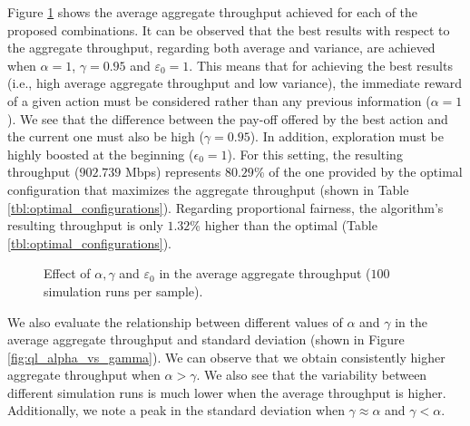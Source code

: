 \documentclass[conference]{IEEEtran}
\begin{document}
	Figure \ref{fig:ql_alpha_gamma_epsilon_evaluation} shows the average aggregate throughput achieved for each of the proposed combinations. It can be observed that the best results with respect to the aggregate throughput, regarding both average and variance, are achieved when $\alpha = 1$, $\gamma = 0.95$ and $\varepsilon_0 = 1$. This means that for achieving the best results (i.e., high average aggregate throughput and low variance), the immediate reward of a given action must be considered rather than any previous information ($\alpha = 1$). We see that the difference between the pay-off offered by the best action and the current one must also be high ($\gamma = 0.95$). In addition, exploration must be highly boosted at the beginning ($\epsilon_0=1$). For this setting, the resulting throughput ($902.739$ Mbps) represents $80.29$\% of the one provided by the optimal configuration that maximizes the aggregate throughput (shown in Table \ref{tbl:optimal_configurations}). Regarding proportional fairness, the algorithm's resulting throughput is only $1.32$\% higher than the optimal (Table \ref{tbl:optimal_configurations}). 
	\begin{figure}[h!]
		\centering
		\caption{Effect of $\alpha, \gamma$ and $\varepsilon_0$ in the average aggregate throughput ($100$ simulation runs per sample).}
		\label{fig:ql_alpha_gamma_epsilon_evaluation}
	\end{figure}	
	We also evaluate the relationship between different values of $\alpha$ and $\gamma$ in the average aggregate throughput and standard deviation (shown in Figure \ref{fig:ql_alpha_vs_gamma}).
	We can observe that we obtain consistently higher aggregate throughput when $\alpha > \gamma$. We also see that the variability between different simulation runs is much lower when the average throughput is higher. Additionally, we note a peak in the standard deviation when $\gamma \approx \alpha$ and $\gamma < \alpha$. 	
\end{document}

